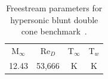 \begin{table}[hbtp]
  \begin{center}
    \caption[Freestream parameters for hypersonic blunt double cone benchmark.]{Freestream parameters for hypersonic blunt double cone benchmark~\cite{maclean_AIAA-2004-529}.\label{table:double_cone-freestream-parameters}}
    \vspace{1em}
    \begin{tabular}{cccc} \hline \hline
      M$_\infty$ & Re$_D$  & T$_\infty$ & T$_w$     \\
      12.43      & 53,666 & \unit[107]{K}   & \unit[297]{K} \\ \hline
    \end{tabular}
  \end{center}
\end{table}



